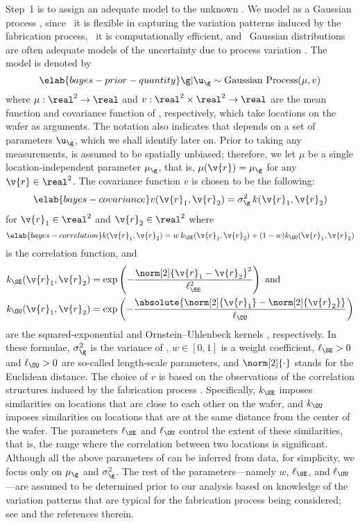 Step~1 is to assign an adequate model to the unknown \g. We model \g as a
Gaussian process \cite{rasmussen2006}, since \one~it is flexible in capturing
the variation patterns induced by the fabrication process, \two~it is
computationally efficient, and \three~Gaussian distributions are often adequate
models of the uncertainty due to process variation \cite{reda2009,
srivastava2010, juan2012}. The model is denoted by
\begin{equation} \elab{bayes-prior-quantity}
  \g | \u_\g \sim \mathrm{Gaussian\ Process}(\mu, v)
\end{equation}
where $\mu: \real^2 \to \real$ and $v: \real^2 \times \real^2 \to \real$ are the
mean function and covariance function of \g, respectively, which take locations
on the wafer as arguments. The notation also indicates that \g depends on a set
of parameters $\u_\g$, which we shall identify later on. Prior to taking any
measurements, \g is assumed to be spatially unbiased; therefore, we let $\mu$ be
a single location-independent parameter $\mu_\g$, that is, $\mu(\v{r}) = \mu_\g$
for any $\v{r} \in \real^2$. The covariance function $v$ is chosen to be the
following:
\begin{equation} \elab{bayes-covariance}
  v(\v{r}_1, \v{r}_2) = \sigma_\g^2 \, k(\v{r}_1, \v{r}_2)
\end{equation}
for $\v{r}_1 \in \real^2$ and $\v{r}_2 \in \real^2$ where
\begin{equation} \elab{bayes-correlation}
  k(\v{r}_1, \v{r}_2) = w \, k_\SE(\v{r}_1, \v{r}_2) + (1 - w) k_\OU(\v{r}_1, \v{r}_2)
\end{equation}
is the correlation function, and
\begin{align*}
  k_\SE(\v{r}_1, \v{r}_2) & = \exp\left(-\frac{\norm[2]{\v{r}_1 - \v{r}_2}^2}{\ell_\SE^2}\right) \text{ and} \\
  k_\OU(\v{r}_1, \v{r}_2) & = \exp\left(-\frac{\absolute{\norm[2]{\v{r}_1} - \norm[2]{\v{r}_2}}}{\ell_\OU}\right)
\end{align*}
are the squared-exponential and Ornstein--Uhlenbeck kernels
\cite{rasmussen2006}, respectively. In these formulae, $\sigma_\g^2$ is the
variance of \g, $w \in [0, 1]$ is a weight coefficient, $\ell_\SE > 0$ and
$\ell_\OU > 0$ are so-called length-scale parameters, and $\norm[2]{\cdot}$
stands for the Euclidean distance. The choice of $v$ is based on the
observations of the correlation structures induced by the fabrication process
\cite{chandrakasan2000, cheng2011}. Specifically, $k_\SE$ imposes similarities
on locations that are close to each other on the wafer, and $k_\OU$ imposes
similarities on locations that are at the same distance from the center of the
wafer. The parameters $\ell_\SE$ and $\ell_\OU$ control the extent of these
similarities, that is, the range where the correlation between two locations is
significant. Although all the above parameters of \g can be inferred from data,
for simplicity, we focus only on $\mu_\g$ and $\sigma_\g^2$. The rest of the
parameters---namely $w$, $\ell_\SE$, and $\ell_\OU$---are assumed to be
determined prior to our analysis based on knowledge of the variation patterns
that are typical for the fabrication process being considered; see
\cite{marzouk2009} and the references therein.

